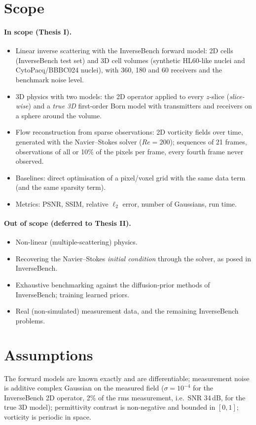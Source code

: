 \section{Scope}
\paragraph{In scope (Thesis I).}
\begin{itemize}
  \item Linear inverse scattering with the InverseBench forward model: 2D cells (InverseBench test set) and 3D cell
  volumes (synthetic HL60-like nuclei and CytoPacq/BBBC024 nuclei), with 360, 180 and 60 receivers and the benchmark
  noise level.
  \item 3D physics with two models: the 2D operator applied to every $z$-slice (\emph{slice-wise}) and a \emph{true 3D}
  first-order Born model with transmitters and receivers on a sphere around the volume.
  \item Flow reconstruction from sparse observations: 2D vorticity fields over time, generated with the
  Navier--Stokes solver ($Re=200$); sequences of 21 frames, observations of all or 10\% of the pixels per frame,
  every fourth frame never observed.
  \item Baselines: direct optimisation of a pixel/voxel grid with the same data term (and the same sparsity term).
  \item Metrics: PSNR, SSIM, relative $\ell_2$ error, number of Gaussians, run time.
\end{itemize}
\paragraph{Out of scope (deferred to Thesis II).}
\begin{itemize}
  \item Non-linear (multiple-scattering) physics.
  \item Recovering the Navier--Stokes \emph{initial condition} through the solver, as posed in InverseBench.
  \item Exhaustive benchmarking against the diffusion-prior methods of InverseBench; training learned priors.
  \item Real (non-simulated) measurement data, and the remaining InverseBench problems.
\end{itemize}

\section{Assumptions}
The forward models are known exactly and are differentiable; measurement noise is additive complex Gaussian on the measured
field ($\sigma=10^{-4}$ for the InverseBench 2D operator, 2\% of the rms measurement, i.e.\ SNR 34\,dB, for the true
3D model); permittivity contrast is non-negative and bounded in $[0,1]$; vorticity is
periodic in space.
